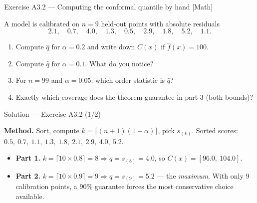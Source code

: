 \documentclass[aspectratio=169,11pt]{beamer}
\begin{document}
\begin{frame}{Exercise A3.2 --- Computing the conformal quantile by hand [Math]}
\begin{exercise}
  A model is calibrated on $n = 9$ held-out points with absolute residuals
  \[
    2.1,\quad 0.7,\quad 4.0,\quad 1.3,\quad 0.5,\quad 2.9,\quad 1.8,\quad 5.2,\quad 1.1 .
  \]
  \begin{enumerate}
    \item Compute $\hat q$ for $\alpha = 0.2$ and write down $C(x)$ if
          $\hat f(x) = 100$.
    \item Compute $\hat q$ for $\alpha = 0.1$. What do you notice?
    \item For $n = 99$ and $\alpha = 0.05$: which order statistic is $\hat q$?
    \item Exactly which coverage does the theorem guarantee in part 3
          (both bounds)?
  \end{enumerate}
\end{exercise}
\end{frame}

\begin{frame}{Solution --- Exercise A3.2 (1/2)}
\begin{solutionbox}
  \textbf{Method.} Sort, compute $k = \lceil (n+1)(1-\alpha) \rceil$, pick $s_{(k)}$.
  Sorted scores: $0.5,\ 0.7,\ 1.1,\ 1.3,\ 1.8,\ 2.1,\ 2.9,\ 4.0,\ 5.2$.
  \begin{itemize}
    \item \textbf{Part 1.} $k = \lceil 10 \times 0.8 \rceil = 8 \Rightarrow
          \hat q = s_{(8)} = 4.0$, so $C(x) = [96.0,\ 104.0]$.
    \item \textbf{Part 2.} $k = \lceil 10 \times 0.9 \rceil = 9 \Rightarrow
          \hat q = s_{(9)} = 5.2$ --- the \emph{maximum}. With only 9 calibration
          points, a 90\% guarantee forces the most conservative choice available.
  \end{itemize}
\end{solutionbox}
\end{frame}
\end{document}
